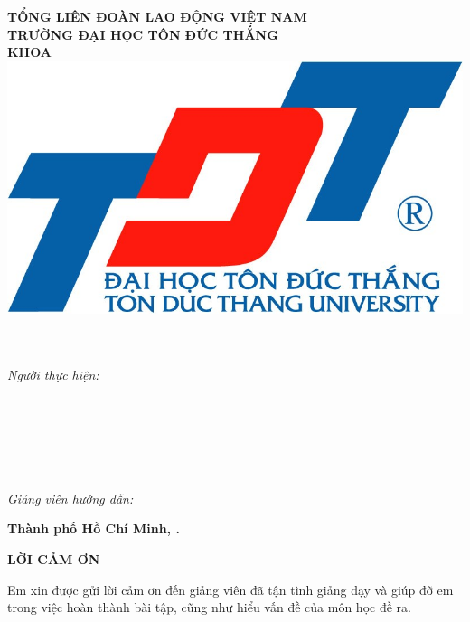 \begin{center}
	\large{\textbf{TỔNG LIÊN ĐOÀN LAO ĐỘNG VIỆT NAM}} \\
	\large{\textbf{TRƯỜNG ĐẠI HỌC TÔN ĐỨC THẮNG}} \\
	\large{\textbf{\MakeUppercase{KHOA \khoa}}} \\\vspace*{1cm}	
	\includegraphics[width=0.5\linewidth]{lib/TDTlogo.jpg}\\\vspace*{1cm}	
	\Large{\textbf{\MakeUppercase{\bai}}}\\		
	\LARGE{\textbf{\MakeUppercase{\de}}}\\
	\Large{\textbf{\MakeUppercase{\monhoc}}}\vspace*{1.5cm}
\begin{flushright}			

	\large{\textit{Người thực hiện:}} \\
	\large{\textbf{\tacgia}}\\
	\large{\textbf{\mstacgia}}\\
	\large{\textbf{\svhai}}\\
	\large{\textbf{\msvhai}}\\
	\large{\textbf{\svba}}\\
	\large{\textbf{\msvba}}\\
	\large{\textit{Giảng viên hướng dẫn:}} \\
	\large{\textbf{\gvhd}} 
	\vspace*{1.5cm}
\end{flushright}
	\large{\textbf{Thành phố Hồ Chí Minh, \nam.}}
\end{center}	
	\newpage
\begin{center}
	\Large{\textbf{LỜI CẢM ƠN}}
\end{center}

	Em xin được gửi lời cảm ơn đến giảng viên \gvhd \mbox{} đã tận tình giảng dạy và giúp đỡ em trong việc hoàn thành bài tập, cũng như hiểu vấn đề của môn học đề ra.\\
	
